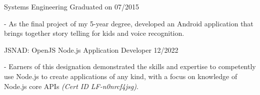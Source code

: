 \documentclass[11pt]{article} %
\begin{document}

\begin{description}
\squish
{}
           {Systems Engineering}
           {Graduated on 07/2015}

- As the final project of my 5-year degree, developed an Android application that brings together story telling for kids and voice recognition.

\end{description}


\begin{description}
\squish
{}
            {JSNAD: OpenJS Node.js Application Developer}
            {12/2022}

- Earners of this designation demonstrated the skills and expertise to competently use Node.js to create applications of any kind, with a focus on knowledge of Node.js core APIs \textit{(Cert ID LF-n0nrcf4jsg)}.

\end{description}
\end{document}
